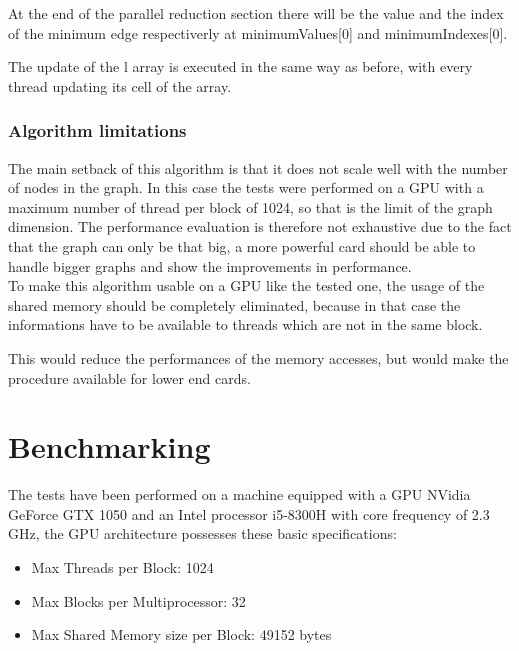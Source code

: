 \documentclass[
	a4paper, %
	12pt, %
]{class}
\begin{document}
At the end of the parallel reduction section there will be the value and the index of the minimum edge respectiverly at minimumValues[0] and minimumIndexes[0].

The update of the l array is executed in the same way as before, with every thread updating its cell of the array.\\

\subsubsection{Algorithm limitations}

The main setback of this algorithm is that it does not scale well with the number of nodes in the graph. In this case the tests were performed on a GPU with
a maximum number of thread per block of 1024, so that is the limit of the graph dimension. The performance evaluation is therefore not exhaustive due to the fact that the graph can
only be that big, a more powerful card should be able to handle bigger graphs and show the improvements in performance.\\

To make this algorithm usable on a GPU like the tested one, the usage of the shared memory should be completely eliminated,
because in that case the informations have to be available to threads which are not in the same block.

This would reduce the performances of the memory accesses, but would make the procedure available for lower end cards.\\

\newpage
\section{Benchmarking}

The tests have been performed on a machine equipped with a GPU NVidia GeForce GTX 1050 and an Intel processor i5-8300H with core frequency of 2.3 GHz,
the GPU architecture possesses these basic specifications:\\

\begin{itemize}
    \item   Max Threads per Block: 1024
    \item   Max Blocks per Multiprocessor: 32
    \item   Max Shared Memory size per Block: 49152 bytes\\
\end{itemize}
\end{document}
